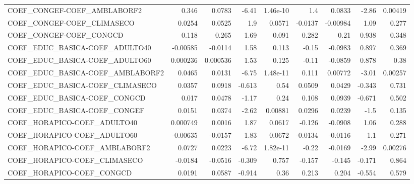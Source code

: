 \begin{tabular}{lrrrrrrrr}
COEF\_CONGEF-COEF\_AMBLABORF2           &       0.346 &       0.0783 &    -6.41 & 1.46e-10 &        1.4 &      0.0833 &        -2.86 &       0.00419 \\
COEF\_CONGEF-COEF\_CLIMASECO            &      0.0254 &       0.0525 &      1.9 &   0.0571 &    -0.0137 &    -0.00984 &         1.09 &         0.277 \\
COEF\_CONGEF-COEF\_CONGCD               &       0.118 &        0.265 &     1.69 &    0.091 &      0.282 &        0.21 &        0.938 &         0.348 \\
COEF\_EDUC\_BASICA-COEF\_ADULTO40        &    -0.00585 &      -0.0114 &     1.58 &    0.113 &      -0.15 &     -0.0983 &        0.897 &         0.369 \\
COEF\_EDUC\_BASICA-COEF\_ADULTO60        &    0.000236 &     0.000536 &     1.53 &    0.125 &      -0.11 &     -0.0859 &        0.878 &          0.38 \\
COEF\_EDUC\_BASICA-COEF\_AMBLABORF2      &      0.0465 &       0.0131 &    -6.75 & 1.48e-11 &      0.111 &     0.00772 &        -3.01 &       0.00257 \\
COEF\_EDUC\_BASICA-COEF\_CLIMASECO       &      0.0357 &       0.0918 &   -0.613 &     0.54 &     0.0509 &      0.0429 &       -0.343 &         0.731 \\
COEF\_EDUC\_BASICA-COEF\_CONGCD          &       0.017 &       0.0478 &    -1.17 &     0.24 &      0.108 &      0.0939 &       -0.671 &         0.502 \\
COEF\_EDUC\_BASICA-COEF\_CONGEF          &      0.0151 &       0.0374 &    -2.62 &  0.00881 &     0.0296 &      0.0239 &         -1.5 &         0.135 \\
COEF\_HORAPICO-COEF\_ADULTO40           &    0.000749 &       0.0016 &     1.87 &   0.0617 &     -0.126 &     -0.0908 &         1.06 &         0.288 \\
COEF\_HORAPICO-COEF\_ADULTO60           &    -0.00635 &      -0.0157 &     1.83 &   0.0672 &    -0.0134 &     -0.0116 &          1.1 &         0.271 \\
COEF\_HORAPICO-COEF\_AMBLABORF2         &      0.0727 &       0.0223 &    -6.72 & 1.82e-11 &      -0.22 &     -0.0169 &        -2.99 &       0.00276 \\
COEF\_HORAPICO-COEF\_CLIMASECO          &     -0.0184 &      -0.0516 &   -0.309 &    0.757 &     -0.157 &      -0.145 &       -0.171 &         0.864 \\
COEF\_HORAPICO-COEF\_CONGCD             &      0.0191 &       0.0587 &   -0.914 &     0.36 &      0.213 &       0.204 &       -0.554 &         0.579 \\

\end{tabular}
